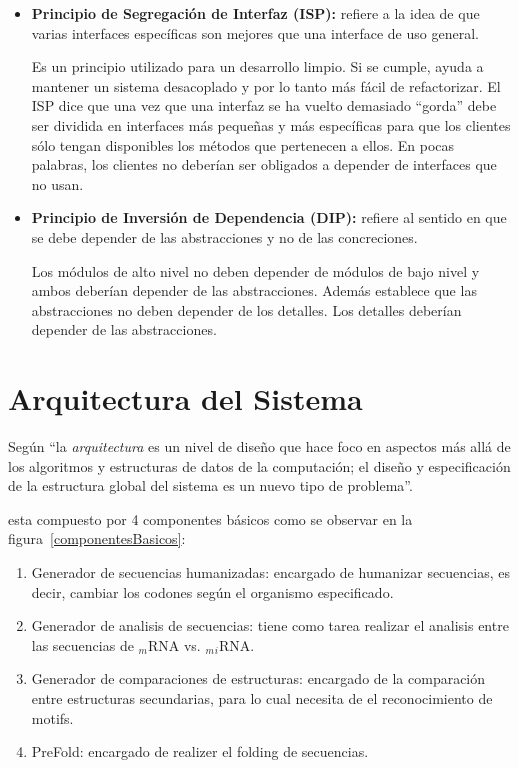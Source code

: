 \begin{itemize}
	\item \textbf{Principio de Segregación de Interfaz (ISP):} refiere a la idea de que varias interfaces específicas son mejores que una interface de uso general.
	\par Es un principio utilizado para un desarrollo limpio. Si se cumple, ayuda a mantener un sistema desacoplado y por lo tanto más fácil de refactorizar. El ISP dice que una vez que una interfaz se ha vuelto demasiado ``gorda'' debe ser dividida en interfaces más pequeñas y más específicas para que los clientes sólo tengan disponibles los métodos que pertenecen a ellos. En pocas palabras, los clientes no deberían ser obligados a depender de interfaces que no usan. 

	\item \textbf{Principio de Inversión de Dependencia (DIP):} refiere al sentido en que se debe depender de las abstracciones y no de las concreciones.
	\par Los módulos de alto nivel no deben depender de módulos de bajo nivel y ambos deberían depender de las abstracciones. Además establece que las abstracciones no deben depender de los detalles. Los detalles deberían depender de las abstracciones. 
\end{itemize}

\section{Arquitectura del Sistema}
\par Según \cite{arquitecturaSistema} ``la \emph{arquitectura} es un nivel de diseño que hace foco en aspectos más allá de los algoritmos y estructuras de datos de la computación; el diseño y especificación de la estructura global del sistema es un nuevo tipo de problema''.

\par \remo esta compuesto por 4 componentes básicos como se observar en la figura~\ref{componentesBasicos}:

\begin{enumerate}
	\item Generador de secuencias humanizadas: encargado de humanizar secuencias, es decir, cambiar los codones según el organismo especificado.

	\item Generador de analisis de secuencias: tiene como tarea realizar el analisis entre las secuencias de $_m$RNA vs. $_m$$_i$RNA.

	\item Generador de comparaciones de estructuras: encargado de la comparación entre estructuras secundarias, para lo cual necesita de el reconocimiento de motifs.

	\item PreFold: encargado de realizer el folding de secuencias.

\end{enumerate}

